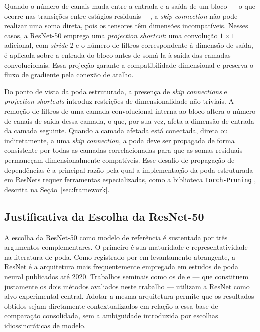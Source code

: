 Quando o número de canais muda entre a entrada e a saída de um bloco --- o que ocorre nas transições entre estágios residuais ---, a \textit{skip connection} não pode realizar uma soma direta, pois os tensores têm dimensões incompatíveis. Nesses casos, a ResNet-50 emprega uma \textit{projection shortcut}: uma convolução $1 \times 1$ adicional, com \textit{stride} 2 e o número de filtros correspondente à dimensão de saída, é aplicada sobre a entrada do bloco antes de somá-la à saída das camadas convolucionais. Essa projeção garante a compatibilidade dimensional e preserva o fluxo de gradiente pela conexão de atalho.

Do ponto de vista da poda estruturada, a presença de \textit{skip connections} e \textit{projection shortcuts} introduz restrições de dimensionalidade não triviais. A remoção de filtros de uma camada convolucional interna ao bloco altera o número de canais de saída dessa camada, o que, por sua vez, afeta a dimensão de entrada da camada seguinte. Quando a camada afetada está conectada, direta ou indiretamente, a uma \textit{skip connection}, a poda deve ser propagada de forma consistente por todas as camadas correlacionadas para que as somas residuais permaneçam dimensionalmente compatíveis. Esse desafio de propagação de dependências é a principal razão pela qual a implementação da poda estruturada em ResNets requer ferramentas especializadas, como a biblioteca \texttt{Torch-Pruning} \cite{Fang2023}, descrita na Seção~\ref{sec:framework}.

\subsection{Justificativa da Escolha da ResNet-50}\label{subsec:justificativa_resnet50}

A escolha da ResNet-50 como modelo de referência é sustentada por três argumentos complementares. O primeiro é sua maturidade e representatividade na literatura de poda. Como registrado por  em levantamento abrangente, a ResNet é a arquitetura mais frequentemente empregada em estudos de poda neural publicados até 2020. Trabalhos seminais como os de  e  --- que constituem justamente os dois métodos avaliados neste trabalho --- utilizam a ResNet como alvo experimental central. Adotar a mesma arquitetura permite que os resultados obtidos sejam diretamente contextualizados em relação a essa base de comparação consolidada, sem a ambiguidade introduzida por escolhas idiossincráticas de modelo.

